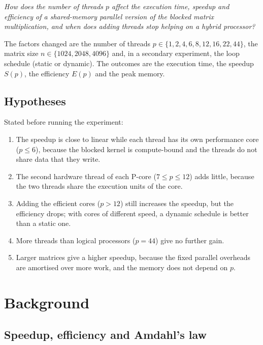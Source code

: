 \documentclass[12pt,a4paper]{report}
\begin{document}
\textit{How does the number of threads $p$ affect the execution time, speedup and efficiency of a shared-memory
parallel version of the blocked matrix multiplication, and when does adding threads stop helping on a hybrid
processor?}

The factors changed are the number of threads $p \in \{1, 2, 4, 6, 8, 12, 16, 22, 44\}$, the matrix size
$n \in \{1024, 2048, 4096\}$ and, in a secondary experiment, the loop schedule (static or dynamic). The outcomes are
the execution time, the speedup $S(p)$, the efficiency $E(p)$ and the peak memory.

\section{Hypotheses}

Stated before running the experiment:
\begin{enumerate}[label=\textbf{H\arabic*.}]
  \item The speedup is close to linear while each thread has its own performance core ($p \le 6$), because the
  blocked kernel is compute-bound and the threads do not share data that they write.
  \item The second hardware thread of each P-core ($7 \le p \le 12$) adds little, because the two threads share the
  execution units of the core.
  \item Adding the efficient cores ($p > 12$) still increases the speedup, but the efficiency drops; with cores of
  different speed, a dynamic schedule is better than a static one.
  \item More threads than logical processors ($p = 44$) give no further gain.
  \item Larger matrices give a higher speedup, because the fixed parallel overheads are amortised over more work, and
  the memory does not depend on $p$.
\end{enumerate}

\chapter{Background}

\section{Speedup, efficiency and Amdahl's law}
\end{document}
